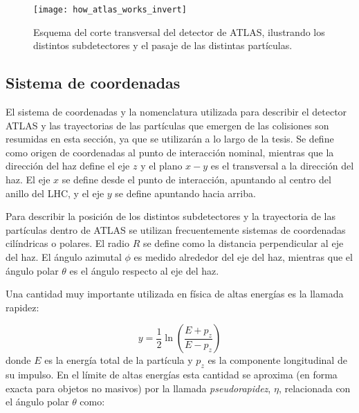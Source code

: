 \begin{figure}[!p]
  \centering

  \texttt{[image: how\_atlas\_works\_invert]}

  \caption{Esquema del corte transversal del detector de ATLAS, ilustrando los distintos
  subdetectores y el pasaje de las distintas partículas.}
  \label{fig:how_atlas_works}

\end{figure}


\subsection{Sistema de coordenadas}


El sistema de coordenadas y la nomenclatura utilizada para describir el detector
ATLAS y las trayectorias de las partículas que emergen de las colisiones son
resumidas en esta sección, ya que se utilizarán a lo largo de la tesis. Se
define como origen de coordenadas al punto de interacción nominal, mientras que
la dirección del haz define el eje $z$ y el plano $x-y$ es el transversal a la
dirección del haz. El eje $x$ se define desde el punto de interacción, apuntando
al centro del anillo del LHC, y el eje $y$ se define apuntando hacia arriba.

Para describir la posición de los distintos
subdetectores y la trayectoria de las partículas dentro de ATLAS se utilizan
frecuentemente sistemas de coordenadas cilíndricas o polares. El radio $R$ se
define como la distancia perpendicular al eje del haz. El ángulo azimutal $\phi
$ es medido alrededor del eje del haz, mientras que el ángulo polar $\theta$
es el ángulo respecto al eje del haz.

Una cantidad muy importante utilizada en física de altas energías es la
llamada rapidez:

\begin{equation}
  y = \frac{1}{2} \ln \left( \frac{E+p_z}{E-p_z} \right)
\end{equation}
%
donde $E$ es la energía total de la partícula y $p_z$ es la componente
longitudinal de su impulso. En el límite de altas energías esta cantidad se
aproxima (en forma exacta para objetos no masivos) por la llamada
\emph{pseudorapidez}, $\eta$, relacionada con el ángulo polar $\theta$ como:

